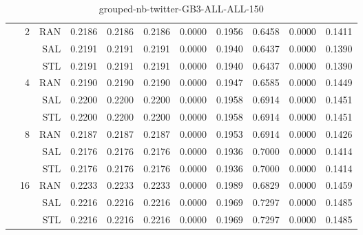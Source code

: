 \begin{center}
\begin{table}[htbp]
\begin{tabular}{ | r | r | r | r | r | r | r | r | r | r | r |}
 & \multirow{3}{*}{2} & RAN & 0.2186 & 0.2186 & 0.2186 & 0.0000 & 0.1956 & 0.6458 & 0.0000 & 0.1411\\ \cline{3-11}
 &   & SAL & 0.2191 & 0.2191 & 0.2191 & 0.0000 & 0.1940 & 0.6437 & 0.0000 & 0.1390\\ \cline{3-11}
 &   & STL & 0.2191 & 0.2191 & 0.2191 & 0.0000 & 0.1940 & 0.6437 & 0.0000 & 0.1390\\ \cline{2-11}
 & \multirow{3}{*}{4} & RAN & 0.2190 & 0.2190 & 0.2190 & 0.0000 & 0.1947 & 0.6585 & 0.0000 & 0.1449\\ \cline{3-11}
 &   & SAL & 0.2200 & 0.2200 & 0.2200 & 0.0000 & 0.1958 & 0.6914 & 0.0000 & 0.1451\\ \cline{3-11}
 &   & STL & 0.2200 & 0.2200 & 0.2200 & 0.0000 & 0.1958 & 0.6914 & 0.0000 & 0.1451\\ \cline{2-11}
 & \multirow{3}{*}{8} & RAN & 0.2187 & 0.2187 & 0.2187 & 0.0000 & 0.1953 & 0.6914 & 0.0000 & 0.1426\\ \cline{3-11}
 &   & SAL & 0.2176 & 0.2176 & 0.2176 & 0.0000 & 0.1936 & 0.7000 & 0.0000 & 0.1414\\ \cline{3-11}
 &   & STL & 0.2176 & 0.2176 & 0.2176 & 0.0000 & 0.1936 & 0.7000 & 0.0000 & 0.1414\\ \cline{2-11}
 & \multirow{3}{*}{16} & RAN & 0.2233 & 0.2233 & 0.2233 & 0.0000 & 0.1989 & 0.6829 & 0.0000 & 0.1459\\ \cline{3-11}
 &   & SAL & 0.2216 & 0.2216 & 0.2216 & 0.0000 & 0.1969 & 0.7297 & 0.0000 & 0.1485\\ \cline{3-11}
 &   & STL & 0.2216 & 0.2216 & 0.2216 & 0.0000 & 0.1969 & 0.7297 & 0.0000 & 0.1485\\ \cline{2-11}
\hline
\end{tabular}
\caption{grouped-nb-twitter-GB3-ALL-ALL-150}
\end{table}
\end{center}

